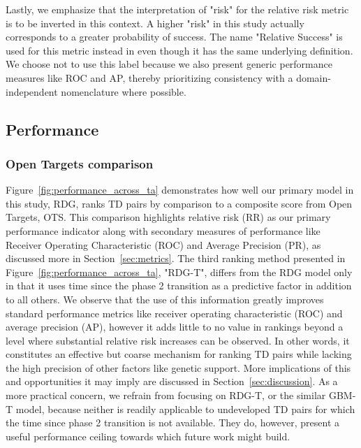 \documentclass{article}
\begin{document}
Lastly, we emphasize that the interpretation of "risk" for the relative risk metric is to be inverted in this context. A higher "risk" in this study actually corresponds to a greater probability of success. The name "Relative Success" is used for this metric instead in \cite{Minikel2023.06.23.23291765} even though it has the same underlying definition. We choose not to use this label because we also present generic performance measures like ROC and AP, thereby prioritizing consistency with a domain-independent nomenclature where possible.

\subsection{Performance}
\label{sec:results_performance}

\subsubsection{Open Targets comparison}

Figure~\ref{fig:performance_across_ta} demonstrates how well our primary model in this study, RDG, ranks TD pairs by comparison to a composite score from Open Targets, OTS. This comparison highlights relative risk (RR) as our primary performance indicator along with secondary measures of performance like Receiver Operating Characteristic (ROC) and Average Precision (PR), as discussed more in Section~\ref{sec:metrics}. The third ranking method presented in Figure~\ref{fig:performance_across_ta}, "RDG-T", differs from the RDG model only in that it uses time since the phase 2 transition as a predictive factor in addition to all others. We observe that the use of this information greatly improves standard performance metrics like receiver operating characteristic (ROC) and average precision (AP), however it adds little to no value in rankings beyond a level where substantial relative risk increases can be observed. In other words, it constitutes an effective but coarse mechanism for ranking TD pairs while lacking the high precision of other factors like genetic support. More implications of this and opportunities it may imply are discussed in Section~\ref{sec:discussion}. As a more practical concern, we refrain from focusing on RDG-T, or the similar GBM-T model, because neither is readily applicable to undeveloped TD pairs for which the time since phase 2 transition is not available. They do, however, present a useful performance ceiling towards which future work might build.
\end{document}
